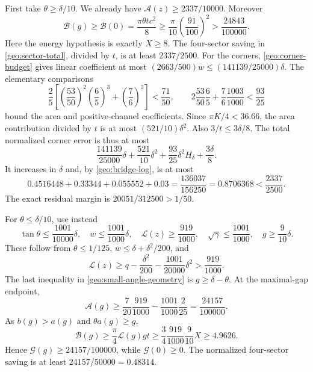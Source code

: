 \documentclass[11pt,reqno]{amsart}
\numberwithin{equation}{section}
\begin{document}
First take $\theta\ge\delta/10$.  We already have
$\mathcal A(z)\ge2337/10000$.  Moreover
\[
 \mathcal B(g)\ge\mathcal B(0)
     =\frac{\pi\theta t c^2}{8}
     \ge\frac\pi{10}\left(\frac{91}{100}\right)^2
     >\frac{24843}{100000}.
\]
Here the energy hypothesis is exactly $X\ge8$.  The four-sector saving
in \eqref{geo:sector-total}, divided by $t$, is at least $2337/2500$.
For the corners, \eqref{geo:corner-budget} gives linear coefficient at
most $(2663/500)w\le(141139/25000)\delta$.  The elementary comparisons
\[
 \frac25\left[\left(\frac{53}{50}\right)^2
                         \left(\frac65\right)^3
                        +\left(\frac76\right)^3\right]<\frac{71}{50},
 \qquad
 2\frac{53}{50}\frac65+\frac76\frac{1003}{1000}<\frac{93}{25}
\]
bound the area and positive-channel coefficients.  Since $\pi K/4<36.66$,
the area contribution divided by $t$ is at most $(521/10)\delta^2$.
Also $3/t\le3\delta/8$.  The total normalized corner error is thus at most
\[
 \frac{141139}{25000}\delta+\frac{521}{10}\delta^2
                 +\frac{93}{25}\delta^2H_\delta+\frac{3\delta}{8}.
\]
It increases in $\delta$ and, by \eqref{geo:bridge-log}, is at most
\[
 0.4516448+0.33344+0.055552+0.03
     =\frac{136037}{156250}=0.8706368<\frac{2337}{2500}.
\]
The exact residual margin is $20051/312500>1/50$.

For $\theta\le\delta/10$, use instead
\begin{equation}\label{geo:small-angle-geometry}
 \tan\theta\le\frac{1001}{10000}\delta,\quad
 w\le\frac{1001}{1000}\delta,\quad
 \mathcal L(z)\ge\frac{919}{1000},\quad
 \sqrt\gamma\le\frac{1001}{1000},\quad g\ge\frac9{10}\delta.
\end{equation}
These follow from $\theta\le1/125$,
$w\le\delta+\delta^2/200$, and
\[
 \mathcal L(z)\ge q-\frac{\delta^2}{200}
                         -\frac{1001}{20000}\delta^2>\frac{919}{1000}.
\]
The last inequality in \eqref{geo:small-angle-geometry} is
$g\ge\delta-\theta$.  At the maximal-gap endpoint,
\[
 \mathcal A(g)\ge\frac7{20}\frac{919}{1000}
                   -\frac{1001}{1000}\frac2{25}
               =\frac{24157}{100000}.
\]
As $b(g)>a(g)$ and $\theta a(g)\ge g$,
\[
 \mathcal B(g)\ge\frac\pi4\mathcal L(g)gt
     \ge\frac34\frac{919}{1000}\frac9{10}X\ge4.9626.
\]
Hence $\mathcal G(g)\ge24157/100000$, while $\mathcal G(0)\ge0$.
The normalized four-sector saving is at least $24157/50000=0.48314$.
\end{document}
